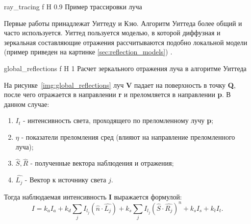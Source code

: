 {ray_tracing} %
{f} %
{H} %
{0.9\textwidth} %
{Пример трассировки луча} %






Первые работы принадлежат Уиттеду и Кэю. Алгоритм Уиттеда более общий и часто используется.
Уиттед пользуется моделью, в которой диффузная и зеркальная составляющие отражения рассчитываются подобно локальной модели (пример приведен на картинке \ref{sec:reflection_models}) \cite{Rodgers}.



{global_reflections} %
{f} %
{H} %
{1\textwidth} %
{Расчет зеркального отражения луча в алгоритме Уиттеда} %


На рисунке~\ref{img:global_reflections} луч \textbf{V} падает на поверхность в точку \textbf{Q}, после чего отражается в направлении \textbf{r} и преломляется
в направлении \textbf{p}.
В данном случае:
\begin{enumerate}
	\item $I_t$ - интенсивность света, проходящего по преломленному лучу \textbf{p};
	\item $\eta$ - показатели преломления сред (влияют на направление преломленного луча);
	\item $\hat{S},\hat{R}$ - полученные вектора наблюдения и отражения;
	\item $\hat{L_j}$ - Вектор к источнику света $j$.

\end{enumerate}

Тогда наблюдаемая интенсивность \textbf{I} выражается формулой:
\begin{equation} 
	I = k_aI_a + k_d \sum_{j} I_{l_j}(\hat{n} \cdot \hat{L_j}) + k_s \sum_{j} I_{l_j}(\hat{S} \cdot \hat{R_j})^n + k_sI_s + k_tI_t.
	\label{eq:intensivity}
\end{equation}

